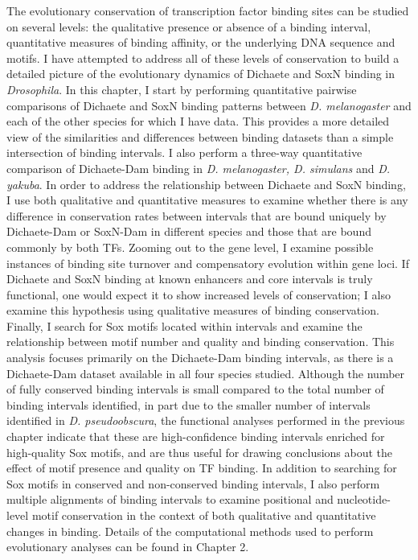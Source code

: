 The evolutionary conservation of transcription factor binding sites can be studied on several levels: the qualitative presence or absence of a binding interval, quantitative measures of binding affinity, or the underlying DNA sequence and motifs. I have attempted to address all of these levels of conservation to build a detailed picture of the evolutionary dynamics of Dichaete and SoxN binding in \emph{Drosophila}. In this chapter, I start by performing quantitative pairwise comparisons of Dichaete and SoxN binding patterns between \emph{D. melanogaster} and each of the other species for which I have data. This provides a more detailed view of the similarities and differences between binding datasets than a simple intersection of binding intervals. I also perform a three-way quantitative comparison of Dichaete-Dam binding in \emph{D. melanogaster, D. simulans} and \emph{D. yakuba}. In order to address the relationship between Dichaete and SoxN binding, I use both qualitative and quantitative measures to examine whether there is any difference in conservation rates between intervals that are bound uniquely by Dichaete-Dam or SoxN-Dam in different species and those that are bound commonly by both TFs. Zooming out to the gene level, I examine possible instances of binding site turnover and compensatory evolution within gene loci. If Dichaete and SoxN binding at known enhancers and core intervals is truly functional, one would expect it to show increased levels of conservation; I also examine this hypothesis using qualitative measures of binding conservation.\\

Finally, I search for Sox motifs located within intervals and examine the relationship between motif number and quality and binding conservation. This analysis focuses primarily on the Dichaete-Dam binding intervals, as there is a Dichaete-Dam dataset available in all four species studied. Although the number of fully conserved binding intervals is small compared to the total number of binding intervals identified, in part due to the smaller number of intervals identified in \emph{D. pseudoobscura}, the functional analyses performed in the previous chapter indicate that these are high-confidence binding intervals enriched for high-quality Sox motifs, and are thus useful for drawing conclusions about the effect of motif presence and quality on TF binding. In addition to searching for Sox motifs in conserved and non-conserved binding intervals, I also perform multiple alignments of binding intervals to examine positional and nucleotide-level motif conservation in the context of both qualitative and quantitative changes in binding. Details of the computational methods used to perform evolutionary analyses can be found in Chapter 2.

